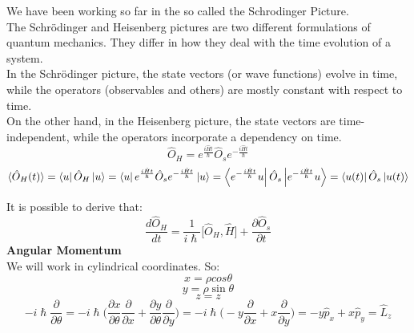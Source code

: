 \documentclass{article}
\begin{document}
We have been working so far in the so called the Schrodinger Picture.\\
The Schrödinger and Heisenberg pictures are two different formulations of quantum mechanics. They differ in how they deal with the time evolution of a system.\\
In the Schrödinger picture, the state vectors (or wave functions) evolve in time, while the operators (observables and others) are mostly constant with respect to time.\\
On the other hand, in the Heisenberg picture, the state vectors are time-independent, while the operators incorporate a dependency on time.
$$\hat{O}_H = e^{\frac{i \hat{H} t}{\hslash}} \hat{O}_s e^{-\frac{i \hat{H} t}{\hslash}}$$
\begin{align*}
    \langle \hat{O}_H(t) \rangle = \bra{u} \hat{O}_H \ket{u} = \bra{u} e^{\frac{i \hat{H} t}{\hslash}} \hat{O}_s e^{-\frac{i \hat{H} t}{\hslash}} \ket{u} = \bra{e^{-\frac{i \hat{H} t}{\hslash}}u} \hat{O}_s\ket{ e^{-\frac{i \hat{H} t}{\hslash}} u} =  \bra{u(t)} \hat{O}_s \ket{u(t)}
\end{align*}

It is possible to derive that:
$$\frac{d \hat{O}_H}{dt} = \frac{1}{i\hslash} \bigl[ \hat{O}_H, \hat{H} \bigl] + \frac{\partial \hat{O}_s}{\partial t}$$
\textbf{Angular Momentum} \\
We will work in cylindrical coordinates. So:
$$x= \rho cos\theta$$
$$y = \rho \sin\theta$$
$$z= z$$
$$-i \hslash \frac{\partial}{\partial \theta} = - i \hslash \biggl( \frac{\partial x}{\partial \theta} \frac{\partial}{\partial x} + \frac{\partial y}{\partial \theta} \frac{\partial}{\partial y} \biggl) = - i \hslash \biggl( -y \frac{\partial}{\partial x} + x \frac{\partial}{\partial y} \biggl) = - y \hat{p}_x + x \hat{p}_y = \hat{L}_z$$
\end{document}
